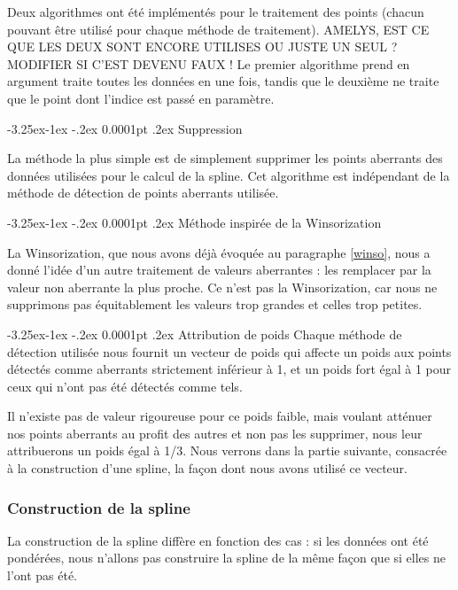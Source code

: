 \documentclass[a4paper,12pt]{article} %
\makeatletter
\renewcommand\paragraph{\@startsection{paragraph}{4}{\z@}%
                                      {-3.25ex\@plus -1ex \@minus -.2ex}%
                                      {0.0001pt \@plus .2ex}%
                                      {\normalfont\normalsize\bfseries}}
\makeatother
\begin{document}
                    Deux algorithmes ont été implémentés pour le traitement des points (chacun pouvant être utilisé pour chaque méthode de traitement). AMELYS, EST CE QUE LES DEUX SONT ENCORE UTILISES OU JUSTE UN SEUL ? MODIFIER SI C'EST DEVENU FAUX !
                    Le premier algorithme prend en argument traite toutes les données en une fois, tandis que le deuxième ne traite que le point dont l'indice est passé en paramètre. 
                    
					\paragraph{Suppression}
                    					
                        La méthode la plus simple est de simplement supprimer les points aberrants des données utilisées pour le calcul de la spline. Cet algorithme est indépendant de la méthode de détection de points aberrants utilisée.
                        
					\paragraph{Méthode inspirée de la Winsorization}
					
    					La Winsorization, que nous avons déjà évoquée au paragraphe \ref{winso}, nous a donné l'idée d'un autre traitement de valeurs aberrantes : les remplacer par la valeur non aberrante la plus proche. Ce n'est pas la Winsorization, car nous ne supprimons pas équitablement les valeurs trop grandes et celles trop petites.
    					
					\paragraph{Attribution de poids}
					    Chaque méthode de détection utilisée nous fournit un vecteur de poids qui affecte un poids aux points détectés comme aberrants strictement inférieur à 1, et un poids fort égal à 1 pour ceux qui n'ont pas été détectés comme tels.
					    
					    Il n'existe pas de valeur rigoureuse pour ce poids faible, mais voulant atténuer nos points aberrants au profit des autres et non pas les supprimer, nous leur attribuerons un poids égal à 1/3. Nous verrons dans la partie suivante, consacrée à la construction d'une spline, la façon dont nous avons utilisé ce vecteur.
				
					    
			    \subsubsection{Construction de la spline}
			        La construction de la spline diffère en fonction des cas : si les données ont été pondérées, nous n'allons pas construire la spline de la même façon que si elles ne l'ont pas été.
\end{document}
